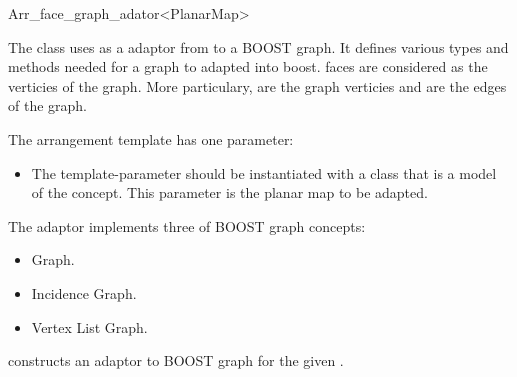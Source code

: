 
\ccRefPageBegin

\begin{ccRefClass}{Arr_face_graph_adator<PlanarMap>}
    
\ccDefinition

The class uses as a adaptor from  to a BOOST graph. It 
defines various 
types and methods needed for a graph to adapted into boost.  
faces are considered as the verticies of the graph. More particulary, 
 are the graph verticies and 
 are the edges of the graph.

The arrangement template has one parameter:
\begin{itemize}
\item The  template-parameter should be instantiated with
a class that is a model of the  concept. This parameter 
is the planar map to be adapted.
\end{itemize}

The adaptor implements three of BOOST graph concepts:
\begin{itemize}
\item Graph.
\item Incidence Graph.
\item Vertex List Graph.
\end{itemize}


\ccCreation
{}
    
    {constructs an adaptor to BOOST graph for the given .}
    
\ccSeeAlso
    \\

\end{ccRefClass}

\ccRefPageEnd
